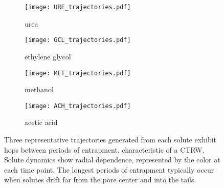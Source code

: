 \documentclass[journal=ancac3,manuscript=article,layout=twocolumn]{achemso}
\begin{document}
  \begin{figure*}
  \centering
  \begin{subfigure}{0.45\textwidth}
  \texttt{[image: URE\_trajectories.pdf]}
  \caption{urea}\label{fig:URE_trajectories}
  \end{subfigure}
  \begin{subfigure}{0.45\textwidth}
  \texttt{[image: GCL\_trajectories.pdf]}
  \caption{ethylene glycol}\label{fig:GCL_trajectories}
  \end{subfigure}
  \begin{subfigure}{0.45\textwidth}
  \texttt{[image: MET\_trajectories.pdf]}
  \caption{methanol}\label{fig:MET_trajectories}
  \end{subfigure}
  \begin{subfigure}{0.45\textwidth}
  \texttt{[image: ACH\_trajectories.pdf]}
  \caption{acetic acid}\label{fig:ACH_trajectories}
  \end{subfigure}
  \caption{Three representative trajectories generated from each solute exhibit hops
	  between periods of entrapment, characteristic of a CTRW. Solute
	  dynamics show radial dependence, represented by the color at each
	  time point. The longest periods of entrapment typically occur when
	  solutes drift far from the pore center and into the tails.
  }\label{fig:solute_trajectories}
  \end{figure*}
  
\end{document}
